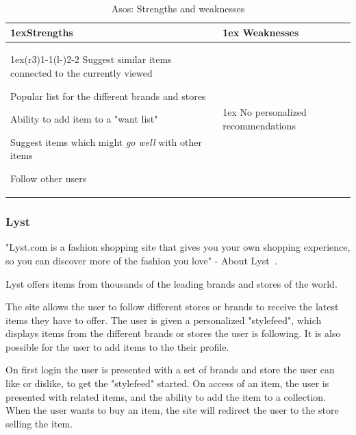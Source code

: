 \begin{table}[H]
    \centering
    \begin{tabularx}{\linewidth}{>{\parskip1ex}X@{\kern4\tabcolsep}>{\parskip1ex}X}
        \toprule
        \hfil\bfseries Strengths
        &
        \hfil\bfseries Weaknesses
        \\\cmidrule(r{3\tabcolsep}){1-1}\cmidrule(l{-\tabcolsep}){2-2}
        Suggest similar items connected to the currently viewed \par
        Popular list for the different brands and stores \par
        Ability to add item to a "want list" \par
        Suggest items which might \emph{go well} with other items \par
        Follow other users \par
        &
        No personalized recommendations \par
        \\\bottomrule
    \end{tabularx}
    \caption{Asos: Strengths and weaknesses}
    \label{table:ecommerceAsos}
\end{table}

\subsubsection{Lyst} %
\label{par:lyst}

"Lyst.com is a fashion shopping site that gives you your own shopping
experience, so you can discover more of the fashion you love" - About
Lyst~\cite{lyst}.

Lyst offers items from thousands of the leading brands and stores of the world.

The site allows the user to follow different stores or brands to receive the
latest items they have to offer.  The user is given a personalized "stylefeed",
which displays items from the different brands or stores the user is following.
It is also possible for the user to add items to the their profile.

On first login the user is presented with a set of brands and store the user
can like or dislike, to get the "stylefeed" started.  On access of an item, the
user is presented with related items, and the ability to add the item to a
collection.  When the user wants to buy an item, the site will redirect the
user to the store selling the item.

